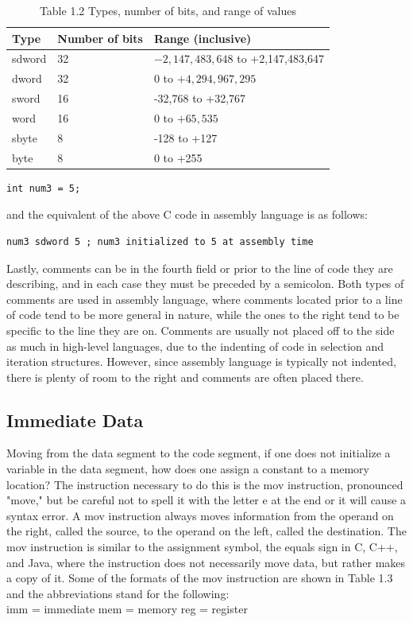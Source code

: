 \documentclass[10pt]{article}
\begin{document}
\begin{table}[h]
\begin{center}
\captionsetup{labelformat=empty}
\caption{Table 1.2 Types, number of bits, and range of values}
\begin{tabular}{|l|l|l|}
\hline
Type & Number of bits & Range (inclusive) \\
\hline
sdword & 32 & $-2,147,483,648$ to +2,147,483,647 \\
\hline
dword & 32 & 0 to $+4,294,967,295$ \\
\hline
sword & 16 & -32,768 to +32,767 \\
\hline
word & 16 & 0 to $+65,535$ \\
\hline
sbyte & 8 & -128 to +127 \\
\hline
byte & 8 & 0 to +255 \\
\hline
\end{tabular}
\end{center}
\end{table}

\begin{verbatim}
int num3 = 5;
\end{verbatim}

and the equivalent of the above C code in assembly language is as follows:

\begin{verbatim}
num3 sdword 5 ; num3 initialized to 5 at assembly time
\end{verbatim}

Lastly, comments can be in the fourth field or prior to the line of code they are describing, and in each case they must be preceded by a semicolon. Both types of comments are used in assembly language, where comments located prior to a line of code tend to be more general in nature, while the ones to the right tend to be specific to the line they are on. Comments are usually not placed off to the side as much in high-level languages, due to the indenting of code in selection and iteration structures. However, since assembly language is typically not indented, there is plenty of room to the right and comments are often placed there.

\subsection*{Immediate Data}
Moving from the data segment to the code segment, if one does not initialize a variable in the data segment, how does one assign a constant to a memory location? The instruction necessary to do this is the mov instruction, pronounced "move," but be careful not to spell it with the letter e at the end or it will cause a syntax error. A mov instruction always moves information from the operand on the right, called the source, to the operand on the left, called the destination. The mov instruction is similar to the assignment symbol, the equals sign in C, C++, and Java, where the instruction does not necessarily move data, but rather makes a copy of it. Some of the formats of the mov instruction are shown in Table 1.3 and the abbreviations stand for the following:\\
imm = immediate mem = memory reg = register
\end{document}
